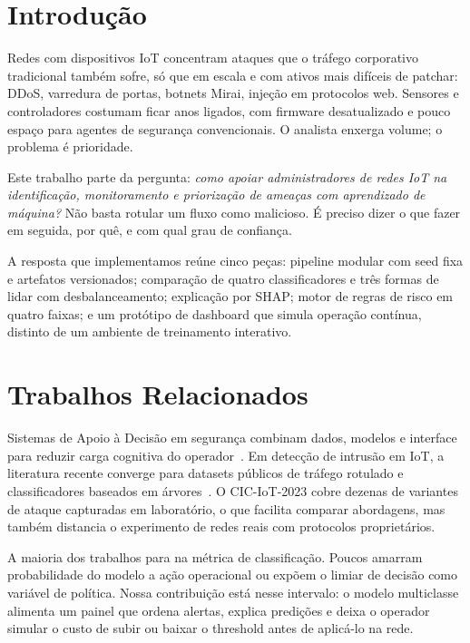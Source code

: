 \documentclass[12pt]{article}
\begin{document}
\section{Introdução}

Redes com dispositivos IoT concentram ataques que o tráfego corporativo tradicional também sofre, só que em escala e com ativos mais difíceis de patchar: DDoS, varredura de portas, botnets Mirai, injeção em protocolos web.
Sensores e controladores costumam ficar anos ligados, com firmware desatualizado e pouco espaço para agentes de segurança convencionais.
O analista enxerga volume; o problema é prioridade.

Este trabalho parte da pergunta: \textit{como apoiar administradores de redes IoT na identificação, monitoramento e priorização de ameaças com aprendizado de máquina?}
Não basta rotular um fluxo como malicioso.
É preciso dizer o que fazer em seguida, por quê, e com qual grau de confiança.

A resposta que implementamos reúne cinco peças: pipeline modular com seed fixa e artefatos versionados; comparação de quatro classificadores e três formas de lidar com desbalanceamento; explicação por SHAP; motor de regras de risco em quatro faixas; e um protótipo de dashboard que simula operação contínua, distinto de um ambiente de treinamento interativo.

\section{Trabalhos Relacionados}

Sistemas de Apoio à Decisão em segurança combinam dados, modelos e interface para reduzir carga cognitiva do operador~\cite{turban2015}.
Em detecção de intrusão em IoT, a literatura recente converge para datasets públicos de tráfego rotulado e classificadores baseados em árvores~\cite{ciciot2023,ke2017,chen2016}.
O CIC-IoT-2023 cobre dezenas de variantes de ataque capturadas em laboratório, o que facilita comparar abordagens, mas também distancia o experimento de redes reais com protocolos proprietários.

A maioria dos trabalhos para na métrica de classificação.
Poucos amarram probabilidade do modelo a ação operacional ou expõem o limiar de decisão como variável de política.
Nossa contribuição está nesse intervalo: o modelo multiclasse alimenta um painel que ordena alertas, explica predições e deixa o operador simular o custo de subir ou baixar o threshold antes de aplicá-lo na rede.
\end{document}
